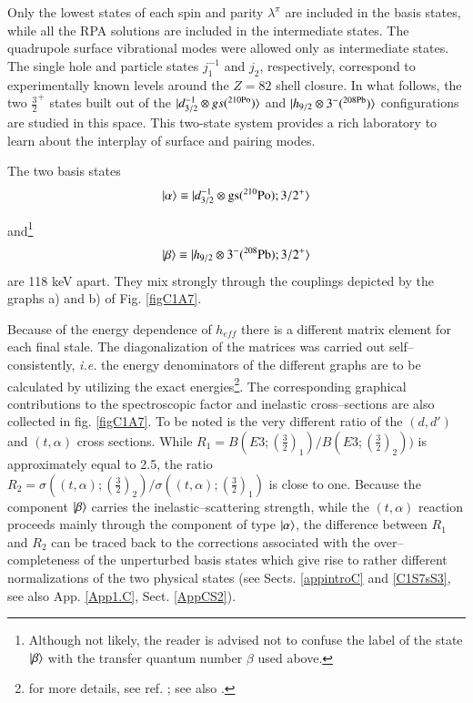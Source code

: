 Only the lowest states of each spin and parity $\lambda^{\pi}$ are included in the basis states, while all the RPA solutions are included in the intermediate states. The quadrupole surface vibrational modes were allowed only as intermediate states. The single hole and particle states $j_1^{-1}$ and $j_2$, respectively, correspond to experimentally known levels around the $Z = 82$ shell closure.  
In what follows, the  two $\frac{3}{2}^+$ states built out of the $|{d_{3/2}^{-1}\otimes gs(^{210\text{Po}})} \rangle$ and $|{h_{9/2}\otimes 3^{-}(^{208\text{Pb}})} \rangle$ configurations are studied in this space. This two-state system provides a rich laboratory to learn about the interplay of surface and pairing modes. 

The two basis states 
  \begin{align}\label{eqC1A89} 
   |{\alpha} \rangle\equiv |{d_{3/2}^{-1}\otimes \text{gs}(^{210}\text{Po});3/2^+} \rangle
    \end{align} 


and\footnote{Although not likely, the reader is advised not to confuse the label of the state $|{\beta} \rangle$ with the transfer quantum number $\beta$ used above.}
  \begin{align}\label{eqC1A90} 
      |{\beta} \rangle\equiv |{h_{9/2}\otimes 3^-(^{208}\text{Pb});3/2^+} \rangle
    \end{align} 
are 118 keV apart. They mix strongly through the couplings depicted by the graphs a) and b) of Fig. \ref{figC1A7}. 


Because of the energy dependence of $h_{eff}$ there is a different matrix element 
for each final stale. The diagonalization of the matrices was carried out self--consistently, \textit{i.e.} the energy denominators of the different graphs are to be calculated by utilizing the exact energies\footnote{for more details, see ref. \cite{Bortignon:77}; see also \cite{Bortignon:76}.}. 
The corresponding graphical contributions to the spectroscopic factor and inelastic cross--sections are also collected in fig. \ref{figC1A7}. To be noted is the very different ratio of the $(d,d')$ and $(t,\alpha)$ cross sections. While $R_1=B(E3;(\frac{3}{2})_1)/B(E3;(\frac{3}{2})_2))$ is approximately equal to 2.5, the ratio $R_2=\sigma((t,\alpha);(\frac{3}{2})_2)/\sigma((t,\alpha);(\frac{3}{2})_1)$ is close to one. Because the component $|{\beta} \rangle$ carries the inelastic--scattering strength, while the $(t,\alpha)$ reaction proceeds mainly through the component of type $|{\alpha} \rangle$, the difference between $R_1$ and $R_2$ can be traced back to the corrections associated with the over--completeness of the unperturbed basis states which give rise to rather different normalizations of the two physical states (see Sects. \ref{appintroC} and \ref{C1S7sS3}, see also App. \ref{App1.C}, Sect. \ref{AppCS2}).
